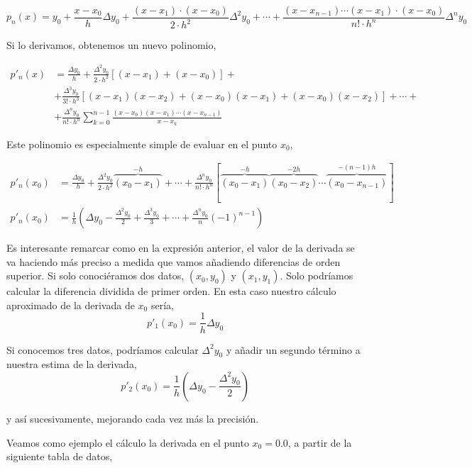 \begin{equation*}
p_n(x)=y_0+\frac{x-x_0}{h}\Delta y_0+\frac{(x-x_1)\cdot (x-x_0)}{2\cdot h^2}\Delta^2 y_0+\cdots +\frac{(x-x_{n-1}) \cdots (x-x_1)\cdot (x-x_0)}{n! \cdot h^n}\Delta^n y_0
\end{equation*}

Si lo derivamos, obtenemos un nuevo polinomio,

\begin{align*}
p'_n(x)&=\frac{\Delta y_0}{h}+\frac{\Delta^2 y_0}{2\cdot h^2}\left[(x-x_1)+(x-x_0) \right] +\\
&+\frac{\Delta^3 y_0}{3! \cdot h^3}\left[(x-x_1)(x-x_2)+(x-x_0)(x-x_1)+(x-x_0)(x-x_2)\right]+\cdots +\\
&+\frac{\Delta^n y_0}{n! \cdot h^n}\sum_{k=0}^{n-1}\frac{(x-x_0)(x-x_1)\cdots (x-x_{n-1})}{x-x_k}
\end{align*}

Este polinomio es especialmente simple de evaluar en el punto $x_0$,

\begin{align*}
p'_n(x_0)&=\frac{\Delta y_0}{h}+\frac{\Delta^2 y_0}{2\cdot h^2}\overbrace{(x_0-x_1)}^{-h}+\cdots +
\frac{\Delta^n y_0}{n! \cdot h^n}[\overbrace{(x_0-x_1)}^{-h}\overbrace{(x_0-x_2)}^{-2h}\cdots \overbrace{(x_0-x_{n-1})}^{-(n-1)h}]\\
p'_n(x_0)&=\frac{1}{h}\left(\Delta y_0-\frac{\Delta^2 y_0}{2}+\frac{\Delta^3 y_0}{3}+\cdots +
\frac{\Delta^n y_0}{n}(-1)^{n-1}\right)
\end{align*}

Es interesante remarcar como en la expresión anterior, el valor de la derivada se va haciendo más preciso a medida que vamos añadiendo diferencias de orden superior. Si solo conociéramos dos datos, $(x_0, y_0)$ y $(x_1, y_1)$. Solo podríamos calcular la diferencia dividida de primer orden. En esta caso nuestro cálculo aproximado de la derivada de $x_0$ sería,
\begin{equation*}
p'_1(x_0)=\frac{1}{h}\Delta y_0
\end{equation*}

Si conocemos tres datos, podríamos calcular $\Delta^2y_0$ y añadir un segundo término a nuestra estima de la derivada,
\begin{equation*}
p'_2(x_0)=\frac{1}{h}\left(\Delta y_0-\frac{\Delta^2 y_0}{2}\right)
\end{equation*}

y así sucesivamente, mejorando cada vez más la precisión.

Veamos como ejemplo el cálculo la derivada en el punto $x_0=0.0$, a partir de la siguiente tabla de datos,

